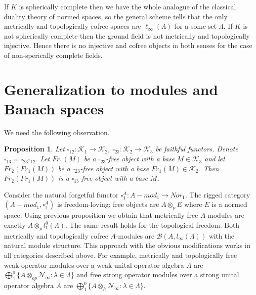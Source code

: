 \documentclass[a0b,landscape]{a0poster}
\newtheorem*{proposition}{Proposition}
\begin{document}
\begin{multicols}{4}
If $K$ is spherically complete then we have the whole analogue of the classical duality theory of normed spaces, so the general scheme tells that the only metrically and
topologically cofree spaces are $\ell_\infty(\Lambda)$ for a some set $\Lambda$. If $K$ is not spherically complete then the ground field is not metrically and topologically injective. 
Hence there is no injective and cofree objects in both senses for the case of non-sperically complete fields.






\section*{Generalization to modules and Banach spaces}


We need the following observation.

\begin{proposition}Let $\square_{12}:\mathcal{K}_1\to\mathcal{K}_2$, $\square_{23}:\mathcal{K}_2\to\mathcal{K}_3$ be faithful functors. Denote $\square_{13}=\square_{23}\square_{12}$. Let 
$Fr_1(M)$ be a $\square_{23}$-free object with a base $M \in \mathcal{K}_3$ and let $Fr_2(Fr_1(M))$ be a $\square_{23}$-free object with a base $Fr_1(M) \in \mathcal{K}_2$. 
Then $Fr_2(Fr_1(M))$ is a $\square_{13}$-free object with a base $M$.
\end{proposition}

Consider the natural forgetful functor $\square^{A}_{1}:A-mod_1\to Nor_1$. The rigged category $(A-mod_1, \square^{A}_{1})$ is freedom-loving; free objects are 
$A \otimes_p E$ where $E$ is a normed space. Using previous proposition we obtain that metrically free $A$-modules are exactly $A \otimes_p l_1^0(\Lambda)$. The same result holds 
for the topological freedom. Both metrically and topologically cofree $A$-modules are $\mathcal{B}(A, l_{\infty}(\Lambda))$ with the natural module structure. This approach 
with the obvious modifications works in all categories described above. For example, metrically and topologically free weak operator modules over a weak unital operator algebra $A$ are 
$\bigoplus_1^0\{A \otimes_{op} \mathcal{N}_\infty: \lambda \in \Lambda\}$ and free strong operator modules over a strong unital operator algebra $A$ are 
$\bigoplus_1^0\{A \otimes_{h} \mathcal{N}_\infty: \lambda \in \Lambda\}$.


\end{multicols}
\end{document}
